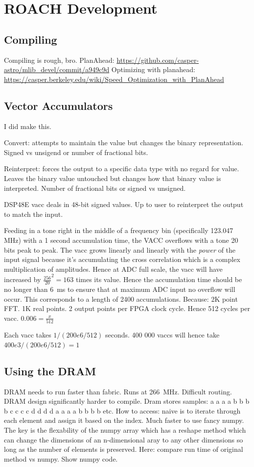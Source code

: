 \chapter{ROACH Development}
\label{appendix:roach-development}
\graphicspath{{./img/roach-dev/}}

\section{Compiling}
Compiling is rough, bro.
PlanAhead: \url{https://github.com/casper-astro/mlib_devel/commit/a949c9d}
Optimizing with planahead: \url{https://casper.berkeley.edu/wiki/Speed_Optimization_with_PlanAhead}

\section{Vector Accumulators}
I did make this.

Convert: attempts to maintain the value but changes the binary representation. Signed vs unsigend or number of fractional bits. 

Reinterpret: forces the output to a specific data type with no regard for value. Leaves the binary value untouched but changes how that binary value is interpreted. Number of fractional bits or signed vs unsigned. 

DSP48E vacc deals in 48-bit signed values. Up to user to reinterpret the output to match the input. 

Feeding in a tone right in the middle of a frequency bin (specifically 123.047 MHz) with a 1 second accumulation time, the VACC overflows with a tone 20 bits peak to peak.
The vacc grows linearly and linearly with the \emph{power} of the input signal because it's accumulating the cross correlation which is a complex multiplication of amplitudes. 
Hence at ADC full scale, the vacc will have increased by \(\frac{256}{20}^2 = 163\) times its value.
Hence the accumulation time should be no longer than \SI{6}{\milli\second} to ensure that at maximum ADC input no overflow will occur. This corresponds to a length of 2400 accumulations.
Because: 2K point FFT. 1K real points. 2 output points per FPGA clock cycle. Hence 512 cycles per vacc.
\(0.006 = \frac{x}{512}\) 

Each vacc takes \(1 / (200e6 / 512)\) seconds. 400 000 vaccs will hence take \(400e3 / (200e6 / 512) = 1 \)

\section{Using the DRAM}
DRAM needs to run faster than fabric. Runs at \SI{266}{\mega\hertz}. Difficult routing. DRAM design significantly harder to compile. 
Dram stores samples: a a a a b b b b c c c c d d d d a a a a b b b b etc. 
How to access: naive is to iterate through each element and assign it based on the index.
Much faster to use fancy numpy. The key is the flexability of the numpy array which has a reshape method which can change the dimensions of an n-dimensional aray to any other dimensions so long as the number of elements is preserved. 
Here: compare run time of original method vs numpy. Show numpy code.

